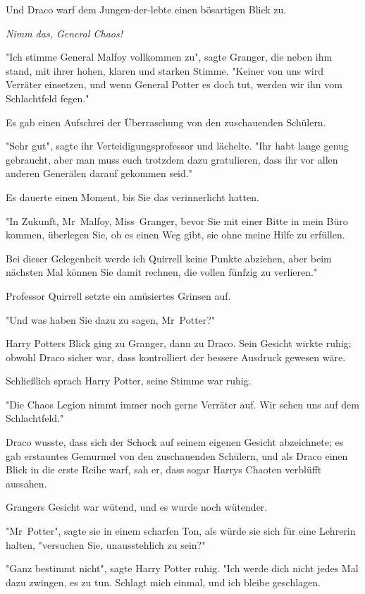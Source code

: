 {Und Draco warf dem Jungen-der-lebte einen bösartigen Blick zu.

\emph{Nimm das, General Chaos!}

"Ich stimme General Malfoy vollkommen zu", sagte Granger, die neben ihm stand, mit ihrer hohen, klaren und starken Stimme. "Keiner von uns wird Verräter einsetzen, und wenn General Potter es doch tut, werden wir ihn vom Schlachtfeld fegen."

Es gab einen Aufschrei der Überraschung von den zuschauenden Schülern.

"Sehr gut", sagte ihr Verteidigungsprofessor und lächelte. "Ihr habt lange genug gebraucht, aber man muss euch trotzdem dazu gratulieren, dass ihr vor allen anderen Generälen darauf gekommen seid."

Es dauerte einen Moment, bis Sie das verinnerlicht hatten.

"In Zukunft, Mr~Malfoy, Miss~Granger, bevor Sie mit einer Bitte in mein Büro kommen, überlegen Sie, ob es einen Weg gibt, sie ohne meine Hilfe zu erfüllen.

Bei dieser Gelegenheit werde ich Quirrell keine Punkte abziehen, aber beim nächsten Mal können Sie damit rechnen, die vollen fünfzig zu verlieren."

Professor Quirrell setzte ein amüsiertes Grinsen auf.

"Und was haben Sie dazu zu sagen, Mr~Potter?"

Harry Potters Blick ging zu Granger, dann zu Draco. Sein Gesicht wirkte ruhig; obwohl Draco sicher war, dass kontrolliert der bessere Ausdruck gewesen wäre.

Schließlich sprach Harry Potter, seine Stimme war ruhig.

"Die Chaos Legion nimmt immer noch gerne Verräter auf. Wir sehen uns auf dem Schlachtfeld."

Draco wusste, dass sich der Schock auf seinem eigenen Gesicht abzeichnete; es gab erstauntes Gemurmel von den zuschauenden Schülern, und als Draco einen Blick in die erste Reihe warf, sah er, dass sogar Harrys Chaoten verblüfft aussahen.

Grangers Gesicht war wütend, und es wurde noch wütender.

"Mr~Potter", sagte sie in einem scharfen Ton, als würde sie sich für eine Lehrerin halten, "versuchen Sie, unausstehlich zu sein?"

"Ganz bestimmt nicht", sagte Harry Potter ruhig. "Ich werde dich nicht jedes Mal dazu zwingen, es zu tun. Schlagt mich einmal, und ich bleibe geschlagen.

}
